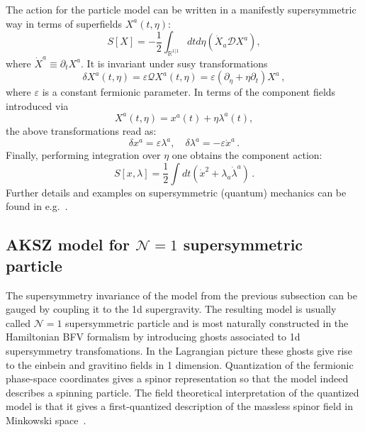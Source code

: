 \documentclass[a4paper,12pt]{article}
\numberwithin{equation}{section} %
\numberwithin{equation}{section}
\newcommand{\stheta}{\eta}
\begin{document}
The action for the particle model can be written in a manifestly supersymmetric way in terms of superfields $X^a(t,\stheta)$:
\begin{equation}\label{N=1 SUSY QM superspace action}
    S[X] = -\frac{1}{2}\int_{\mathbb{R}^{1|1}} dt d\stheta (\dot{X}_a \mathcal{D} X^a),
\end{equation}
where $\dot{X}^a \equiv  \partial_t X^a$. It is invariant under susy transformations 
\begin{equation}\label{N=1 SUSY QM superspace SUSY transform}
    \delta X^a(t,\stheta) = \varepsilon \mathcal{Q}X^a(t,\stheta) = \varepsilon( \partial_\stheta + \stheta \partial_t)X^a\,,
\end{equation}
where $\varepsilon$ is a constant fermionic parameter. In terms of the component fields introduced via
\begin{equation}
    X^a(t,\stheta) = x^a(t) + \stheta \lambda^a(t),
\end{equation}
the above transformations read as:
\begin{equation}\label{N=1 SUSY QM component SUSY transform}
    \delta x^a = \varepsilon \lambda^a, \quad \delta \lambda^a = -\varepsilon\dot{x}^a\,.
\end{equation}
Finally, performing integration over $\stheta$ one obtains the component action:
\begin{equation}\label{N=1 SUSY QM component action}
    S[x,\lambda] = \frac{1}{2}\int dt  \left(\dot{x}^2 + \lambda_a\dot{\lambda}^a\right)\,.
\end{equation}
Further details and examples on supersymmetric (quantum) mechanics can be found in e.g.~\cite{Smilga:2020nte}.

\subsection{AKSZ model for $\mathcal{N}=1$ supersymmetric particle}

The supersymmetry invariance of the model from the previous subsection can be gauged by coupling it to the 1d supergravity. The resulting model is usually called $\mathcal{N}=1$ supersymmetric particle and is most naturally constructed in the Hamiltonian BFV formalism by introducing ghosts associated to 1d supersymmetry transfomations. In the Lagrangian picture these ghosts give rise to the einbein and gravitino fields in 1 dimension. Quantization of the fermionic phase-space coordinates gives a spinor representation so that the model indeed describes a spinning particle. The field theoretical interpretation of the quantized model is that it gives a first-quantized description of the massless spinor field in Minkowski space~\cite{Henneaux:1987cpbis,Howe:1988ft}. 
\end{document}

